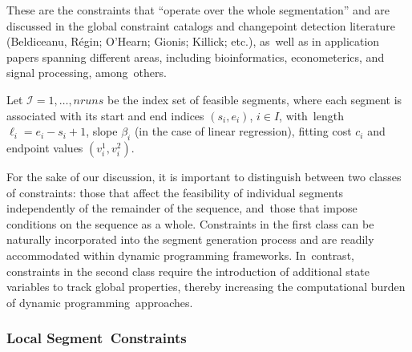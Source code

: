 \documentclass[mathematics,article,accept,pdftex,moreauthors]{Definitions/mdpi}
\begin{document}
These are the constraints that ``operate over the whole segmentation'' and are discussed in the global constraint catalogs and changepoint detection literature (Beldiceanu, Régin; O'Hearn; Gionis; Killick; etc.), as~well as in application papers spanning different areas, including bioinformatics, econometerics, and signal processing, among~others. 

Let $\mathcal{I} = {1, \ldots, nruns}$ be the index set of feasible segments, where each segment is associated with its start and end indices $(s_i,e_i)$, $i \in I$, with~length $\ell_i = e_i - s_i + 1$, slope $\beta_i$ (in the case of linear regression), fitting cost $c_i$ and endpoint values $(v^1_i,v^2_i)$. 

For the sake of our discussion, it is important to distinguish between two classes of constraints: those that affect the feasibility of individual segments independently of the remainder of the sequence, and~those that impose conditions on the sequence as a whole. Constraints in the first class can be naturally incorporated into the segment generation process and are readily accommodated within dynamic programming frameworks. In~contrast, constraints in the second class require the introduction of additional state variables to track global properties, thereby increasing the computational burden of dynamic programming~approaches.

\subsubsection{Local Segment~Constraints} \label{subsubsec:segment_level_constraint}
\end{document}

